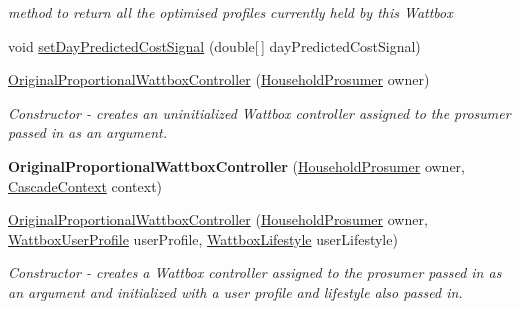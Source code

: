 \begin{DoxyCompactItemize}
\begin{DoxyCompactList}\small\item\em method to return all the optimised profiles currently held by this Wattbox \end{DoxyCompactList}\item 
void \hyperlink{classuk_1_1ac_1_1dmu_1_1iesd_1_1cascade_1_1controllers_1_1_original_proportional_wattbox_controller_a8b5827fa4c1be19f4bd9d7aec48a750b}{set\-Day\-Predicted\-Cost\-Signal} (double\mbox{[}$\,$\mbox{]} day\-Predicted\-Cost\-Signal)
\item 
\hyperlink{classuk_1_1ac_1_1dmu_1_1iesd_1_1cascade_1_1controllers_1_1_original_proportional_wattbox_controller_a90150938c44cf355322f62305232c43e}{Original\-Proportional\-Wattbox\-Controller} (\hyperlink{classuk_1_1ac_1_1dmu_1_1iesd_1_1cascade_1_1agents_1_1prosumers_1_1_household_prosumer}{Household\-Prosumer} owner)
\begin{DoxyCompactList}\small\item\em Constructor -\/ creates an uninitialized Wattbox controller assigned to the prosumer passed in as an argument. \end{DoxyCompactList}\item 
\hypertarget{classuk_1_1ac_1_1dmu_1_1iesd_1_1cascade_1_1controllers_1_1_original_proportional_wattbox_controller_a3d54676d9b012a1ac308d351015d6663}{{\bfseries Original\-Proportional\-Wattbox\-Controller} (\hyperlink{classuk_1_1ac_1_1dmu_1_1iesd_1_1cascade_1_1agents_1_1prosumers_1_1_household_prosumer}{Household\-Prosumer} owner, \hyperlink{classuk_1_1ac_1_1dmu_1_1iesd_1_1cascade_1_1context_1_1_cascade_context}{Cascade\-Context} context)}\label{classuk_1_1ac_1_1dmu_1_1iesd_1_1cascade_1_1controllers_1_1_original_proportional_wattbox_controller_a3d54676d9b012a1ac308d351015d6663}

\item 
\hyperlink{classuk_1_1ac_1_1dmu_1_1iesd_1_1cascade_1_1controllers_1_1_original_proportional_wattbox_controller_a66d998e671cafc444153ae364a44ef29}{Original\-Proportional\-Wattbox\-Controller} (\hyperlink{classuk_1_1ac_1_1dmu_1_1iesd_1_1cascade_1_1agents_1_1prosumers_1_1_household_prosumer}{Household\-Prosumer} owner, \hyperlink{enumuk_1_1ac_1_1dmu_1_1iesd_1_1cascade_1_1controllers_1_1_wattbox_user_profile}{Wattbox\-User\-Profile} user\-Profile, \hyperlink{enumuk_1_1ac_1_1dmu_1_1iesd_1_1cascade_1_1controllers_1_1_wattbox_lifestyle}{Wattbox\-Lifestyle} user\-Lifestyle)
\begin{DoxyCompactList}\small\item\em Constructor -\/ creates a Wattbox controller assigned to the prosumer passed in as an argument and initialized with a user profile and lifestyle also passed in. \end{DoxyCompactList}\end{DoxyCompactItemize}
